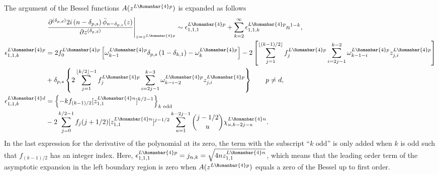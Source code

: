 \documentclass[11pt]{article}
\newcommand{\lln}{L{\tiny\Rleft} n}
\newcommand{\lld}{L{\tiny\Rleft} d}
\newcommand{\ql}{L}
\newcommand{\rl}{{\scriptsize \Romanbar{4}} }
\newcommand{\pg}{p}
\newcommand{\pn}{n}
\newcommand{\pd}{d}
\newcommand{\ps}{s}
\numberwithin{equation}{section}
\newcommand{\Rleft}{\Romanbar{4}}
\begin{document}
The argument of the Bessel functions $A(z^{\ql\rl\pg})$ is expanded as follows 
\begin{align}
	& \left. \frac{\partial^{(\delta_{\pg,\pd})} 2 i \left(n-\delta_{\pg,\ps} \right) \bar{\phi}_{n-\delta_{\pg,\ps} }(z) }{\partial z^{(\delta_{\pg,\pd})}} \right|_{z =z^{\ql\rl\pg}}  \sim \epsilon_{1,1,1}^{\ql\rl\pg}  + \sum_{k=2}^\infty \epsilon_{1,1,k}^{\ql\rl\pg} n^{1-k}, \\ %
	\epsilon_{1,1,k}^{\ql\rl\pg} & = 2f_0^{\ql\rl\pg} \left[\omega_{k-1}^{\ql\rl\pg}\delta_{\pg,\ps}\left(1-\delta_{k,1}\right)  - \omega_{k}^{\ql\rl\pg}\right] - 2\left[\sum_{j=1}^{\lfloor (k-1)/2 \rfloor} f_j^{\ql\rl\pg} \sum_{i=2j-1}^{k-2} \omega_{k-1-i}^{\ql\rl\pg}  z_{j,i}^{\ql\rl\pg} \right] \\  
	& + \delta_{\pg,\ps} \left\{2\sum_{j=1}^{\lfloor k/2 \rfloor -1} f_j^{\ql\rl\pg} \sum_{i=2j-1}^{k-3} \omega_{k-i-2}^{\ql\rl\pg}  z_{j,i}^{\ql\rl\pg} \right\} \qquad  \pg \neq \pd, \\
	\epsilon_{1,1,k}^{\lld} & = \left\{-k f_{(k-1)/2} [z_{1,1}^{\lln}]^{k/2-1} \right\}_{k \text{ odd}}  \\
	& -2 \sum_{j=0}^{k/2-1} f_j (j+1/2) [z_{1,1}^{\lln}]^{j-1/2} \sum_{u=1}^{k-2j-1} {j-1/2 \choose u} \chi_{u,k-2j-u}^{\lln}. 
\end{align}
In the last expression for the derivative of the polynomial at its zero, the term with the subscript ``$k \text{ odd}$'' is only added when $k$ is odd such that $f_{(k-1)/2}$ has an integer index. Here, $\epsilon_{1,1,1}^{\ql\rl\pg} = j_{\alpha,k}= \sqrt{4n z_{1,1}^{\lln}}$, %
which means that the leading order term of the asymptotic expansion in the left boundary region is zero when $A(z^{\ql\rl\pg})$ equals a zero of the Bessel up to first order. %
\end{document}
